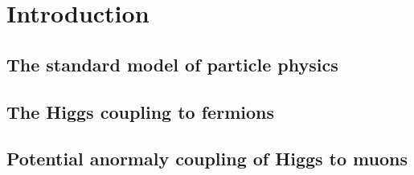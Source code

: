 \chapter{Introduction}

\section{The standard model of particle physics}

\section{The Higgs coupling to fermions}

\section{Potential anormaly coupling of Higgs to muons}